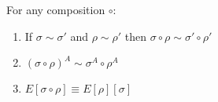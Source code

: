 \begin{lemma}
For any composition $\circ$:
\begin{enumerate}
\item
If $\sigma \sim \sigma'$ and $\rho \sim \rho'$ then $\sigma \circ \rho \sim \sigma' \circ \rho'$
\item
$(\sigma \circ \rho)^A \sim \sigma^A \circ \rho^A$
\item
$E [ \sigma \circ \rho ] \equiv E [ \rho ] [ \sigma ]$
\end{enumerate}
\end{lemma}

\begin{code}%
\>[0]\<[2]%
\>[2] \AgdaSymbol{:}  \AgdaSymbol{\{}  \AgdaSymbol{\}} \AgdaSymbol{\{}  \AgdaSymbol{:}    \AgdaSymbol{\}} \AgdaSymbol{\{}  \AgdaSymbol{:}    \AgdaSymbol{\}}  \<[62]%
\>[62]\<%
\\
\>[2]\<[4]%
\>[4]            \AgdaSymbol{(}  \AgdaSymbol{)} \AgdaSymbol{(}  \AgdaSymbol{)}\<%
\end{code}

